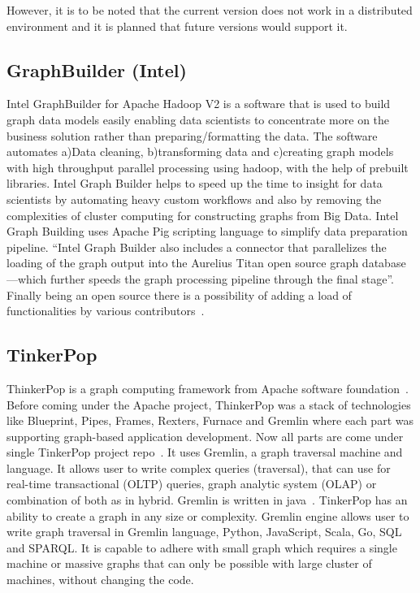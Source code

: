     However, it is to be noted that the current version does not work
    in a distributed environment and it is planned that future
    versions would support it.
    
\subsection{GraphBuilder (Intel)}

Intel GraphBuilder for Apache Hadoop V2 is a software that is used to
build graph data models easily enabling data scientists to concentrate
more on the business solution rather than preparing/formatting the
data. The software automates a)Data cleaning, b)transforming data and
c)creating graph models with high throughput parallel processing using
hadoop, with the help of prebuilt libraries. Intel Graph Builder helps
to speed up the time to insight for data scientists by automating
heavy custom workflows and also by removing the complexities of
cluster computing for constructing graphs from Big Data. Intel Graph
Building uses Apache Pig scripting language to simplify data
preparation pipeline.  ``Intel Graph Builder also includes a connector
that parallelizes the loading of the graph output into the Aurelius
Titan open source graph database—which further speeds the graph
processing pipeline through the final stage''.  Finally being an open
source there is a possibility of adding a load of functionalities by
various contributors~\cite{graphbuilder}.

    
\subsection{TinkerPop}
    
ThinkerPop is a graph computing framework from Apache software
foundation~\cite{www-ApacheTinkerPop}. Before coming under the Apache
project, ThinkerPop was a stack of technologies like Blueprint, Pipes,
Frames, Rexters, Furnace and Gremlin where each part was supporting
graph-based application development. Now all parts are come under
single TinkerPop project repo~\cite{www-news}. It uses Gremlin, a
graph traversal machine and language. It allows user to write complex
queries (traversal), that can use for real-time transactional (OLTP)
queries, graph analytic system (OLAP) or combination of both as in
hybrid. Gremlin is written in
java~\cite{www-ApacheTinkerPopHome}. TinkerPop has an ability to
create a graph in any size or complexity. Gremlin engine allows user
to write graph traversal in Gremlin language, Python, JavaScript,
Scala, Go, SQL and SPARQL. It is capable to adhere with small graph
which requires a single machine or massive graphs that can only be
possible with large cluster of machines, without changing the code.


